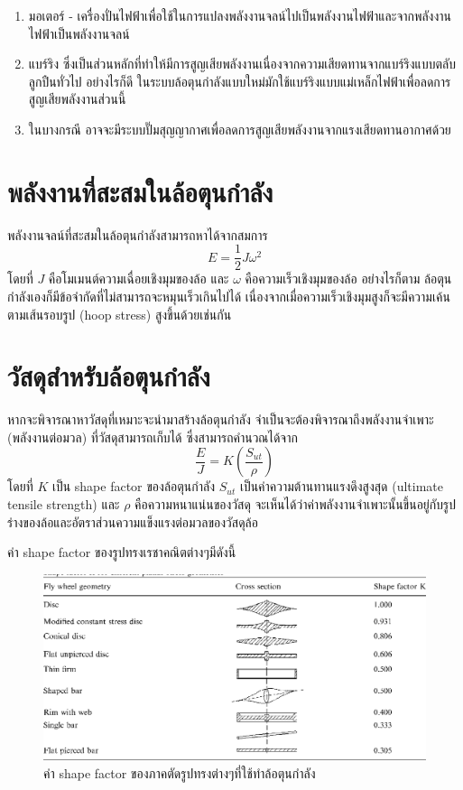 \documentclass[a4paper,nobib,openany,10pt]{tufte-book}
\begin{document}
\begin{enumerate}
\item มอเตอร์ -
เครื่องปั่นไฟฟ้าเพื่อใช้ในการแปลงพลังงานจลน์ไปเป็นพลังงานไฟฟ้าและจากพลังงานไฟฟ้าเป็นพลังงานจลน์

\item แบร์ริง
ซึ่งเป็นส่วนหลักที่ทำให้มีการสูญเสียพลังงานเนื่องจากความเสียดทานจากแบร์ริงแบบตลับลูกปืนทั่วไป
อย่างไรก็ดี
ในระบบล้อตุนกำลังแบบใหม่มักใช้แบร์ริงแบบแม่เหล็กไฟฟ้าเพื่อลดการสูญเสียพลังงานส่วนนี้

\item ในบางกรณี
อาจจะมีระบบปั๊มสุญญากาศเพื่อลดการสูญเสียพลังงานจากแรงเสียดทานอากาศด้วย
\end{enumerate}

\section{พลังงานที่สะสมในล้อตุนกำลัง}
\label{sec:org5d7f5ec}
พลังงานจลน์ที่สะสมในล้อตุนกำลังสามารถหาได้จากสมการ
\[E = \frac{1}{2}J \omega^2\] โดยที่ \(J\)
คือโมเมนต์ความเฉื่อยเชิงมุมของล้อ และ \(\omega\)
คือความเร็วเชิงมุมของล้อ อย่างไรก็ตาม
ล้อตุนกำลังเองก็มีข้อจำกัดที่ไม่สามารถจะหมุนเร็วเกินไปได้
เนื่องจากเมื่อความเร็วเชิงมุมสูงก็จะมีความเค้นตามเส้นรอบรูป (hoop
stress) สูงขึ้นด้วยเช่นกัน

\section{วัสดุสำหรับล้อตุนกำลัง}
\label{sec:orgc30b347}
หากจะพิจารณาหาวัสดุที่เหมาะจะนำมาสร้างล้อตุนกำลัง
จำเป็นจะต้องพิจารณาถึงพลังงานจำเพาะ (พลังงานต่อมวล)
ที่วัสดุสามารถเก็บได้ ซึ่งสามารถคำนวณได้จาก
\[\frac{E}{J} = K \left( \frac{S_{ut}}{\rho} \right)\] โดยที่ \(K\) เป็น
shape factor ของล้อตุนกำลัง \(S_{ut}\) เป็นค่าความต้านทานแรงดึงสูงสุด
(ultimate tensile strength) และ \(\rho\) คือความหนาแน่นของวัสดุ
จะเห็นได้ว่าค่าพลังงานจำเพาะนั้นขึ้นอยู่กับรูปร่างของล้อและอัตราส่วนความแข็งแรงต่อมวลของวัสดุล้อ

ค่า shape factor ของรูปทรงเรชาคณิตต่างๆมีดังนี้

\begin{figure}[htbp]
\centering
\includegraphics[width=.9\linewidth]{./pictures/flywheel-shape-factor.png}
\caption{ค่า shape factor ของภาคตัดรูปทรงต่างๆที่ใช้ทำล้อตุนกำลัง}
\end{figure}
\end{document}

